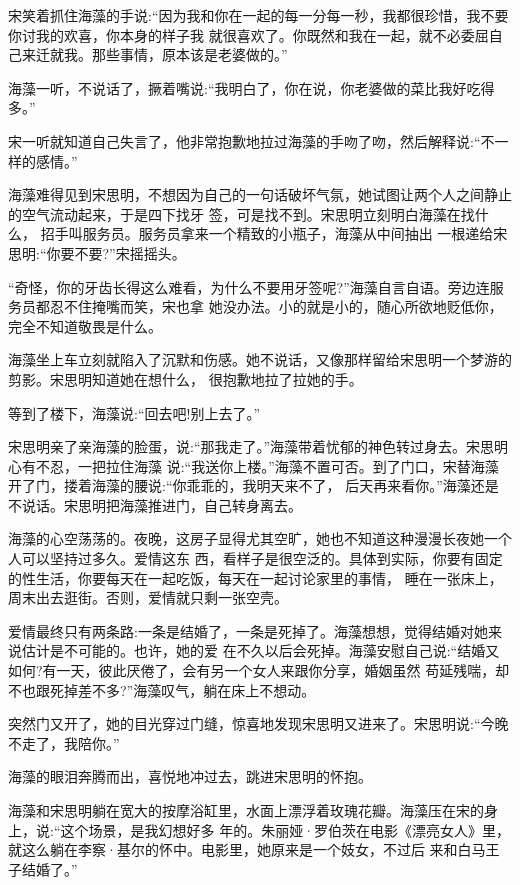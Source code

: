 \documentclass[11pt,a4paper,onecolumn]{article}
\begin{document}
宋笑着抓住海藻的手说:``因为我和你在一起的每一分每一秒，我都很珍惜，我不要你讨我的欢喜，你本身的样子我
就很喜欢了。你既然和我在一起，就不必委屈自己来迁就我。那些事情，原本该是老婆做的。''

海藻一听，不说话了，撅着嘴说:``我明白了，你在说，你老婆做的菜比我好吃得多。''

宋一听就知道自己失言了，他非常抱歉地拉过海藻的手吻了吻，然后解释说:``不一样的感情。''

海藻难得见到宋思明，不想因为自己的一句话破坏气氛，她试图让两个人之间静止的空气流动起来，于是四下找牙
签，可是找不到。宋思明立刻明白海藻在找什么， 招手叫服务员。服务员拿来一个精致的小瓶子，海藻从中间抽出
一根递给宋思明:``你要不要?''宋摇摇头。

``奇怪，你的牙齿长得这么难看，为什么不要用牙签呢?''海藻自言自语。旁边连服务员都忍不住掩嘴而笑，宋也拿
她没办法。小的就是小的，随心所欲地贬低你，完全不知道敬畏是什么。

海藻坐上车立刻就陷入了沉默和伤感。她不说话，又像那样留给宋思明一个梦游的剪影。宋思明知道她在想什么，
很抱歉地拉了拉她的手。

等到了楼下，海藻说:``回去吧!别上去了。''

宋思明亲了亲海藻的脸蛋，说:``那我走了。''海藻带着忧郁的神色转过身去。宋思明心有不忍，一把拉住海藻
说:``我送你上楼。''海藻不置可否。到了门口，宋替海藻开了门，搂着海藻的腰说:``你乖乖的，我明天来不了，
后天再来看你。''海藻还是不说话。宋思明把海藻推进门，自己转身离去。

海藻的心空荡荡的。夜晚，这房子显得尤其空旷，她也不知道这种漫漫长夜她一个人可以坚持过多久。爱情这东
西，看样子是很空泛的。具体到实际，你要有固定的性生活，你要每天在一起吃饭，每天在一起讨论家里的事情，
睡在一张床上，周末出去逛街。否则，爱情就只剩一张空壳。

爱情最终只有两条路:一条是结婚了，一条是死掉了。海藻想想，觉得结婚对她来说估计是不可能的。也许，她的爱
在不久以后会死掉。海藻安慰自己说:``结婚又如何?有一天，彼此厌倦了，会有另一个女人来跟你分享，婚姻虽然
苟延残喘，却不也跟死掉差不多?''海藻叹气，躺在床上不想动。

突然门又开了，她的目光穿过门缝，惊喜地发现宋思明又进来了。宋思明说:``今晚不走了，我陪你。''

海藻的眼泪奔腾而出，喜悦地冲过去，跳进宋思明的怀抱。

海藻和宋思明躺在宽大的按摩浴缸里，水面上漂浮着玫瑰花瓣。海藻压在宋的身上，说:``这个场景，是我幻想好多
年的。朱丽娅·罗伯茨在电影《漂亮女人》里，就这么躺在李察·基尔的怀中。电影里，她原来是一个妓女，不过后
来和白马王子结婚了。''
\end{document}
